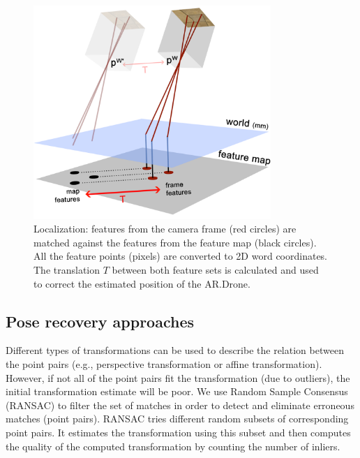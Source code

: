 \begin{figure}[htb]
\centering
\includegraphics[width=9cm]{images/localization1.png}
\caption{Localization: features from the camera frame (red circles) are matched against the features from the feature map (black circles). All the feature points (pixels) are converted to 2D word coordinates. The translation $T$ between both feature sets is calculated and used to correct the estimated position of the AR.Drone.}
\label{fig:localization1}
\end{figure}







\subsection{Pose recovery approaches}
\label{sec:pose-recovery}
Different types of transformations can be used to describe the relation between the point pairs (e.g., perspective transformation or affine transformation).
However, if not all of the point pairs fit the transformation (due to outliers), the initial transformation estimate will be poor.
We use Random Sample Consensus (RANSAC) \cite{fischler1981random} to filter the set of matches in order to detect and eliminate erroneous matches (point pairs).
RANSAC tries different random subsets of corresponding point pairs.
It estimates the transformation using this subset and then computes the quality of the computed transformation by counting the number of inliers.

